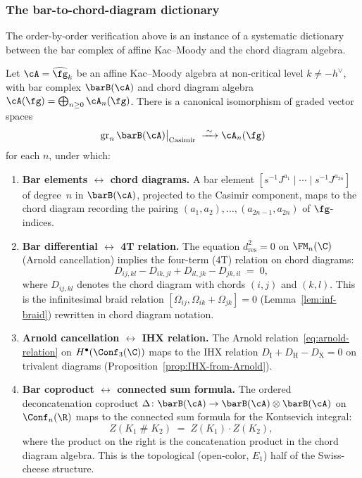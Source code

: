 \subsubsection{The bar-to-chord-diagram dictionary}
\label{subsubsec:bar-chord-dictionary}

The order-by-order verification above is an instance of a
systematic dictionary between the bar complex of affine
Kac--Moody and the chord diagram algebra.

\begin{proposition}
\label{prop:bar-chord-dictionary}
Let $\cA = \widehat{\fg}_k$ be an affine Kac--Moody algebra
at non-critical level $k \neq -h^\vee$, with bar complex
$\barB(\cA)$ and chord diagram algebra
$\cA(\fg) = \bigoplus_{n \geq 0} \cA_n(\fg)$.
There is a canonical isomorphism of graded vector spaces
\[
\mathrm{gr}_n\,\barB(\cA)\big|_{\mathrm{Casimir}}
\;\xrightarrow{\;\sim\;}
\cA_n(\fg)
\]
for each $n$, under which:
\begin{enumerate}[label=\textup{(\roman*)}]
\item \textbf{Bar elements $\longleftrightarrow$ chord diagrams.}
 A bar element
 $[s^{-1}J^{a_1} \mid \cdots \mid s^{-1}J^{a_{2n}}]$ of
 degree~$n$ in $\barB(\cA)$, projected to the Casimir
 component, maps to the chord diagram recording the pairing
 $(a_1, a_2), \ldots, (a_{2n-1}, a_{2n})$ of $\fg$-indices.

\item \textbf{Bar differential $\longleftrightarrow$ 4T relation.}
 The equation $d_{\mathrm{res}}^2 = 0$ on $\FM_n(\C)$
 (Arnold cancellation) implies the four-term (4T) relation
 on chord diagrams:
 \[
 D_{ij,kl} - D_{ik,jl} + D_{il,jk} - D_{jk,il} \;=\; 0,
 \]
 where $D_{ij,kl}$ denotes the chord diagram with chords
 $(i,j)$ and $(k,l)$. This is the infinitesimal braid
 relation
 $[\Omega_{ij}, \Omega_{ik} + \Omega_{jk}] = 0$
 (Lemma~\ref{lem:inf-braid}) rewritten in chord diagram
 notation.

\item \textbf{Arnold cancellation $\longleftrightarrow$
 IHX relation.}
 The Arnold relation~\eqref{eq:arnold-relation} on
 $H^\bullet(\Conf_3(\C))$ maps to the IHX relation
 $D_{\mathrm{I}} + D_{\mathrm{H}} - D_{\mathrm{X}} = 0$
 on trivalent diagrams
 (Proposition~\ref{prop:IHX-from-Arnold}).

\item \textbf{Bar coproduct $\longleftrightarrow$
 connected sum formula.}
 The ordered deconcatenation coproduct
 $\Delta \colon \barB(\cA) \to
 \barB(\cA) \otimes \barB(\cA)$
 on $\Conf_n(\R)$ maps to the connected sum formula for
 the Kontsevich integral:
 \[
 Z(K_1 \mathbin{\#} K_2)
 \;=\;
 Z(K_1) \cdot Z(K_2),
 \]
 where the product on the right is the concatenation product
 in the chord diagram algebra. This is the topological
 (open-color, $E_1$) half of the Swiss-cheese structure.


\end{enumerate}
\end{proposition}
